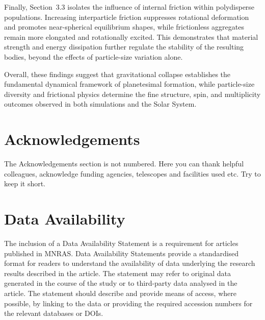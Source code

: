 \documentclass[fleqn,usenatbib]{mnras}
\begin{document}
Finally, Section~3.3 isolates the influence of internal friction within polydisperse populations. Increasing interparticle friction suppresses rotational deformation and promotes near-spherical equilibrium shapes, while frictionless aggregates remain more elongated and rotationally excited. This demonstrates that material strength and energy dissipation further regulate the stability of the resulting bodies, beyond the effects of particle-size variation alone.

Overall, these findings suggest that gravitational collapse establishes the fundamental dynamical framework of planetesimal formation, while particle-size diversity and frictional physics determine the fine structure, spin, and multiplicity outcomes observed in both simulations and the Solar System.

\section*{Acknowledgements}

The Acknowledgements section is not numbered. Here you can thank helpful
colleagues, acknowledge funding agencies, telescopes and facilities used etc.
Try to keep it short.

\section*{Data Availability}

 
The inclusion of a Data Availability Statement is a requirement for articles published in MNRAS. Data Availability Statements provide a standardised format for readers to understand the availability of data underlying the research results described in the article. The statement may refer to original data generated in the course of the study or to third-party data analysed in the article. The statement should describe and provide means of access, where possible, by linking to the data or providing the required accession numbers for the relevant databases or DOIs.









\end{document}
